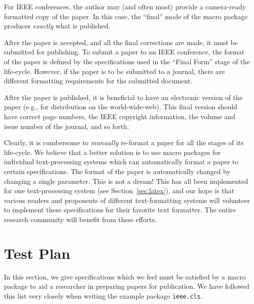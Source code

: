 \documentclass[%
	final,
	notitlepage,
	narroweqnarray,
	inline,
	twoside,
	]{ieee}
\begin{document}
\begin{description}
    For IEEE conferences, the author may (and often must) provide a
    camera-ready formatted copy of the paper. In this case, the 
    ``final'' mode of the macro package produces \emph{exactly} what 
    is published.
\item[Submission for Publishing:] After the paper is accepted,
    and all the final corrections are made, it must be submitted for 
    publishing. To submit a paper to an IEEE conference, the format of 
    the paper is defined by the specifications used in the ``Final Form'' 
    stage of the life-cycle. However, if the paper is to be submitted
    to a journal, there are different formatting requirements for the
    submitted document.
\item[Final Distribution:] After the paper is published, it is
    beneficial to have an electronic version of the paper
    (e.g., for distribution on the world-wide-web). This final
    version should have correct page numbers, the IEEE copyright 
    information, the volume and issue number of the journal, and so forth.
\end{description}


Clearly, it is cumbersome to \emph{manually} re-format a paper for all
the stages of its life-cycle. We believe that a better solution is to
use macro packages for individual text-processing systems which can
automatically format a paper to certain specifications.  The format of
the paper is automatically changed by changing a single parameter.
This is not a dream! This has all been implemented for one
text-processing system (see Section~\ref{sec:latex}), and our hope is
that various readers and proponents of different text-formatting
systems will volunteer to implement these specifications for their
favorite text formatter. The entire research community will benefit
from these efforts.

\section{Test Plan}

In this section, we give specifications which we feel must be
satisfied by a macro package to aid a researcher in preparing papers
for publication. We have followed this list very closely when writing
the example package \texttt{ieee.cls}.
\end{document}

